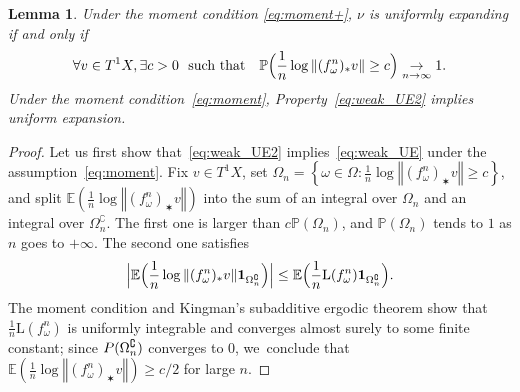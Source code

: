 \documentclass[11pt]{article}
\let\sep :
\newcommand{\set}[1]{\left\{#1\right\}}
\newcommand{\norm}[1]{{\left\Vert#1\right\Vert}}
\newcommand{\Babs}[1]{\Bigl\vert#1\Bigr\vert}
\newcommand{\unsur}[1]{\frac{1}{#1}}
\newcommand{\lrpar}[1]{\left(#1\right)}
\newcommand{\Blrpar}[1]{\Bigl(#1\Bigr)}
\newcommand{\ee}{\mathbb{E}}
\newcommand{\pp}{\mathbb{P}}\let\P\pp
\theoremstyle{plain}
\newtheorem{lem}[thm]{Lemma}
\theoremstyle{definition}
\numberwithin{equation}{section}
\begin{document}
\begin{lem}\label{lem:weak_UE2}
Under the moment condition \eqref{eq:moment+}, $\nu$ is uniformly expanding if and only
if
\begin{equation}\label{eq:weak_UE2}
\forall v \in T^1X, \exists c>0 \ \text{ such that} \quad
\pp\Blrpar{ \unsur{n}\log \norm{ (f^n_\omega)_\varstar v} \geq c} \underset{n\to\infty}{\to} 1.
\end{equation}
Under the moment condition~\eqref{eq:moment}, Property~\eqref{eq:weak_UE2} implies uniform expansion.
\end{lem}

\begin{proof}
Let us first show that~\eqref{eq:weak_UE2} implies~\eqref{eq:weak_UE} under the assumption~\eqref{eq:moment}.
Fix $ v\in T^1X$,
set $\Omega_n = \set{ \omega\in \Omega \sep  \unsur{n}\log \norm{ (f^n_\omega)_\varstar v} \geq c}$, and split
$\ee\lrpar{\unsur{n}\log \norm{ (f^n_\omega)_\varstar v}}$ into the sum of an integral over $\Omega_n$ and an integral over $\Omega_n^\complement$. The first one is larger than $c \pp(\Omega_n)$, and $\pp(\Omega_n)$ tends to $1$ as $n$ goes to $+\infty$. The second one satisfies
\[
\Babs{\ee\Blrpar{\unsur{n}\log \norm{ (f^n_\omega)_\varstar v} \mathbf 1_{\Omega_n^\complement} } }\leq
\ee \Blrpar{ \unsur{n} \mathrm L (f^n_\omega) \mathbf 1_{\Omega_n^\complement} } .
\]
The moment condition and Kingman's subadditive ergodic theorem show that $ \unsur{n} \mathrm L(f^n_\omega)$ is uniformly integrable and converges almost surely to some finite constant; since $ \mathbf \pp({\Omega_n^\complement}) $ converges to $0$, we~conclude that $ \ee\lrpar{\unsur{n}\log \norm{ (f^n_\omega)_\varstar v}}\geq c/2$ for large $n$.


\end{proof}
\end{document}
